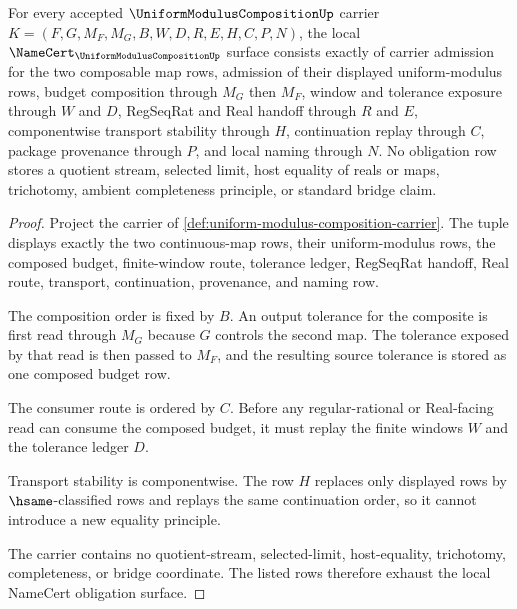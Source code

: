 \begin{theorem}
\label{thm:uniform-modulus-composition-namecert-obligations}
For every accepted $\UniformModulusCompositionUp$ carrier $K=(F,G,M_F,M_G,B,W,D,R,E,H,C,P,N)$, the local $\NameCert_{\UniformModulusCompositionUp}$ surface consists exactly of carrier admission for the two composable map rows, admission of their displayed uniform-modulus rows, budget composition through $M_G$ then $M_F$, window and tolerance exposure through $W$ and $D$, RegSeqRat and Real handoff through $R$ and $E$, componentwise transport stability through $H$, continuation replay through $C$, package provenance through $P$, and local naming through $N$. No obligation row stores a quotient stream, selected limit, host equality of reals or maps, trichotomy, ambient completeness principle, or standard bridge claim.
\end{theorem}
\begin{proof}
Project the carrier of \autoref{def:uniform-modulus-composition-carrier}. The tuple displays exactly the two continuous-map rows, their uniform-modulus rows, the composed budget, finite-window route, tolerance ledger, RegSeqRat handoff, Real route, transport, continuation, provenance, and naming row.

The composition order is fixed by $B$. An output tolerance for the composite is first read through $M_G$ because $G$ controls the second map. The tolerance exposed by that read is then passed to $M_F$, and the resulting source tolerance is stored as one composed budget row.

The consumer route is ordered by $C$. Before any regular-rational or Real-facing read can consume the composed budget, it must replay the finite windows $W$ and the tolerance ledger $D$.

Transport stability is componentwise. The row $H$ replaces only displayed rows by $\hsame$-classified rows and replays the same continuation order, so it cannot introduce a new equality principle.

The carrier contains no quotient-stream, selected-limit, host-equality, trichotomy, completeness, or bridge coordinate. The listed rows therefore exhaust the local NameCert obligation surface.
\end{proof}

